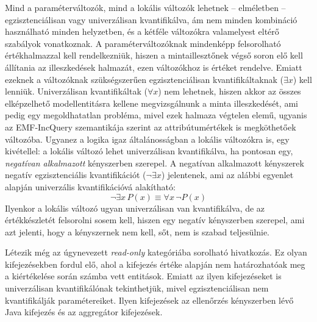 Mind a paraméterváltozók, mind a lokális változók lehetnek -- elméletben -- egzisztenciálisan vagy univerzálisan kvantifikálva, ám nem minden kombináció használható minden helyzetben, és a kétféle változókra valamelyest eltérő szabályok vonatkoznak.
A paraméterváltozóknak mindenképp felsorolható értékhalmazzal kell rendelkezniük, hiszen a mintaillesztőnek végső soron elő kell állítania az illeszkedések halmazát, ezen változókhoz is értéket rendelve.
Emiatt ezeknek a változóknak szükségszerűen egzisztenciálisan kvantifikáltaknak ($\exists x$) kell lenniük.
Univerzálisan kvantifikáltak ($\forall x$) nem lehetnek, hiszen akkor az összes elképzelhető modellentitásra kellene megvizsgálnunk a minta illeszkedését, ami pedig egy megoldhatatlan probléma, mivel ezek halmaza végtelen elemű, ugyanis az EMF-IncQuery szemantikája szerint az attribútumértékek is megköthetőek változóba.
Ugyanez a logika igaz általánosságban a lokális változókra is, egy kivétellel: a lokális változó lehet univerzálisan kvantifikálva, ha pontosan egy, \emph{negatívan alkalmazott} kényszerben szerepel.
A negatívan alkalmazott kényszerek negatív egzisztenciális kvantifikációt ($\neg\exists x$) jelentenek, ami az alábbi egyenlet alapján univerzális kvantifikációvá alakítható:
\begin{equation} \label{eq:negexiststoforall}
\neg\exists x\, P(x) \equiv \forall x\, \neg P(x)
\end{equation}
Ilyenkor a lokális változó ugyan univerzálisan van kvantifikálva, de az értékkészletét felsorolni sosem kell, hiszen egy negatív kényszerben szerepel, ami azt jelenti, hogy a kényszernek nem kell, sőt, nem is szabad teljesülnie.

Létezik még az úgynevezett \emph{read-only} kategóriába sorolható hivatkozás.
Ez olyan kifejezésekben fordul elő, ahol a kifejezés értéke alapján nem határozhatóak meg a kiértékelése során számba vett entitások.
Emiatt az ilyen kifejezéseket is univerzálisan kvantifikálónak tekinthetjük, mivel egzisztenciálisan nem kvantifikálják paramétereiket.
Ilyen kifejezések az ellenőrzés kényszerben lévő Java kifejezés és az aggregátor kifejezések.

